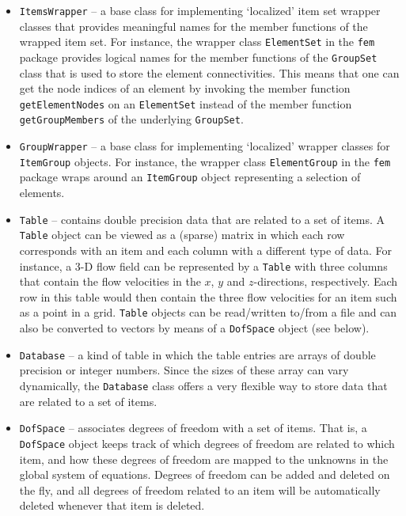 \documentclass[a4paper,11pt]{article}
\newcommand{\Code}[1]{\texttt{#1}}
\begin{document}
\begin{itemize}
\item \Code{ItemsWrapper} -- a base class for implementing `localized'
  item set wrapper classes that provides meaningful names for the
  member functions of the wrapped item set. For instance, the wrapper
  class \Code{ElementSet} in the \Code{fem} package provides logical
  names for the member functions of the \Code{GroupSet} class that is
  used to store the element connectivities. This means that one can
  get the node indices of an element by invoking the member function
  \Code{get\-Element\-Nodes} on an \Code{ElementSet} instead of the
  member function \Code{get\-Group\-Members} of the underlying
  \Code{GroupSet}.

\item \Code{GroupWrapper} -- a base class for implementing `localized'
  wrapper classes for \Code{ItemGroup} objects. For instance, the
  wrapper class \Code{Element\-Group} in the \Code{fem} package wraps
  around an \Code{ItemGroup} object representing a selection of
  elements.

\item \Code{Table} -- contains double precision data that are related
  to a set of items. A \Code{Table} object can be viewed as a (sparse)
  matrix in which each row corresponds with an item and each column
  with a different type of data. For instance, a 3-D flow field can be
  represented by a \Code{Table} with three columns that contain the
  flow velocities in the $x$, $y$ and $z$-directions, respectively.
  Each row in this table would then contain the three flow velocities
  for an item such as a point in a grid. \Code{Table} objects can be
  read/written to/from a file and can also be converted to vectors by
  means of a \Code{DofSpace} object (see below).

\item \Code{Database} -- a kind of table in which the table entries
  are arrays of double precision or integer numbers. Since the sizes
  of these array can vary dynamically, the \Code{Database} class
  offers a very flexible way to store data that are related to a set
  of items.

\item \Code{DofSpace} -- associates degrees of freedom with a set of
  items. That is, a \Code{DofSpace} object keeps track of which
  degrees of freedom are related to which item, and how these degrees
  of freedom are mapped to the unknowns in the global system of
  equations. Degrees of freedom can be added and deleted on the fly,
  and all degrees of freedom related to an item will be automatically
  deleted whenever that item is deleted.


\end{itemize}
\end{document}
